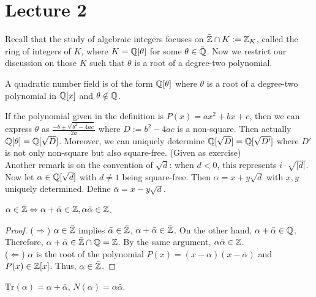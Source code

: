 \documentclass[12pt,twoside=semi,openright,numbers=noenddot]{scrbook}
\begin{document}
\section{Lecture 2}
Recall that the study of algebraic integers focuses on $\bar{\mathbb Z} \cap K := \mathbb Z_K$, called the ring of integers of $K$, where $K = \mathbb Q[\theta]$ for some $\theta \in \bar{\mathbb Q}$.
Now we restrict our discussion on those $K$ such that $\theta$ is a root of a degree-two polynomial. 
\begin{definition}
    A  quadratic number field is of the form $\mathbb Q[\theta]$ where $\theta$ is a root of a degree-two polynomial in $\mathbb Q[x]$ and $\theta \notin \mathbb Q$.
\end{definition}
If the polynomial given in the definition is $P(x) = ax^2+bx+c$, then we can express $\theta$ as $\frac{-b\pm \sqrt{b^2-4ac}}{2a}$ where $D:= b^2-4ac$ is a non-square.
Then actually $\mathbb Q[\theta] = \mathbb Q[\sqrt{D}]$. Moreover, we can uniquely determine $\mathbb Q[\sqrt{D}] = \mathbb Q[\sqrt{D'}]$ where $D'$ is not only non-square but also 
square-free. (Given as exercise)  \\
Another remark is on the convention of $\sqrt{d}$: when $d<0$, this represents $i \cdot \sqrt{|d|}$. \\
Now let $\alpha \in \mathbb Q[\sqrt{d}]$ with $d \neq 1$ being square-free. Then $\alpha = x+y\sqrt{d}$ with $x, y$ uniquely determined.
Define $\bar{\alpha} = x-y\sqrt{d}$.
\begin{remark}
    $\alpha \in \bar{\mathbb Z} \Leftrightarrow \alpha + \bar{\alpha} \in \mathbb Z, \alpha\bar{\alpha}\in \mathbb Z$.
\end{remark}
    \begin{proof}
        ($\Rightarrow$) $\alpha \in \bar{\mathbb Z}$ implies $\bar{\alpha} \in \bar{\mathbb Z}$, $\alpha + \bar{\alpha} \in \bar{\mathbb Z}$. On the other hand,
        $\alpha + \bar{\alpha} \in \mathbb Q$. Therefore, 
        $\alpha + \bar{\alpha} \in \bar{\mathbb Z}\cap \mathbb Q = \mathbb Z$. By the same argument, $\alpha\bar{\alpha} \in \mathbb Z$. \\
        ($\Leftarrow$) $\alpha$ is the root of the polynomial $P(x) = (x-\alpha)(x-\bar{\alpha})$ and $P(x) \in \mathbb Z[x]$. 
        Thus, $\alpha \in \bar{\mathbb Z}$.
    \end{proof}

\begin{remark}
    $\mathrm{Tr}(\alpha) = \alpha + \bar{\alpha}$, $N(\alpha) = \alpha\bar{\alpha}$.
\end{remark}
\end{document}
